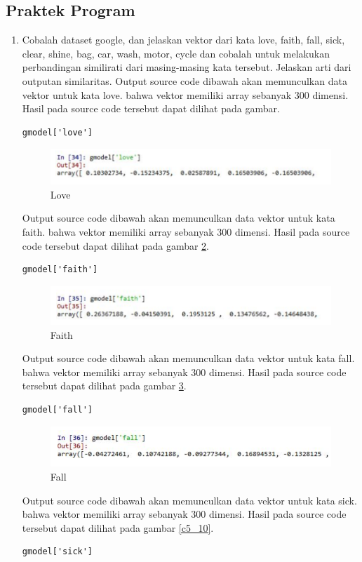 \subsection{Praktek Program}
\begin{enumerate}
\item Cobalah dataset google, dan jelaskan vektor dari kata love, faith, fall, sick, clear, shine, bag, car, wash, motor, cycle dan cobalah untuk melakukan perbandingan similirati dari masing-masing kata tersebut. Jelaskan arti dari outputan similaritas.
\subitem Output source code dibawah akan memunculkan data vektor untuk kata love. bahwa vektor memiliki array sebanyak 300 dimensi. Hasil pada source code tersebut dapat dilihat pada gambar.
\begin{verbatim}
gmodel['love']
\end{verbatim}
\begin{figure}[ht]
	\centerline{\includegraphics[width=1\textwidth]{figures/andi/E1.PNG}}
	\caption{Love}
	\label{c5_7}
\end{figure}
\subitem Output source code dibawah akan memunculkan data vektor untuk kata faith. bahwa vektor memiliki array sebanyak 300 dimensi. Hasil pada source code tersebut dapat dilihat pada gambar \ref{c5_8}.
\begin{verbatim}
gmodel['faith']
\end{verbatim}
\begin{figure}[ht]
	\centerline{\includegraphics[width=1\textwidth]{figures/andi/E2.PNG}}
	\caption{Faith}
	\label{c5_8}
\end{figure}
\subitem Output source code dibawah akan memunculkan data vektor untuk kata fall. bahwa vektor memiliki array sebanyak 300 dimensi. Hasil pada source code tersebut dapat dilihat pada gambar \ref{c5_9}.
\begin{verbatim}
gmodel['fall']
\end{verbatim}
\begin{figure}[ht]
	\centerline{\includegraphics[width=1\textwidth]{figures/andi/E3.PNG}}
	\caption{Fall}
	\label{c5_9}
\end{figure}
\subitem Output source code dibawah akan memunculkan data vektor untuk kata sick. bahwa vektor memiliki array sebanyak 300 dimensi. Hasil pada source code tersebut dapat dilihat pada gambar \ref{c5_10}.
\begin{verbatim}
gmodel['sick']
\end{verbatim}


\end{enumerate}
